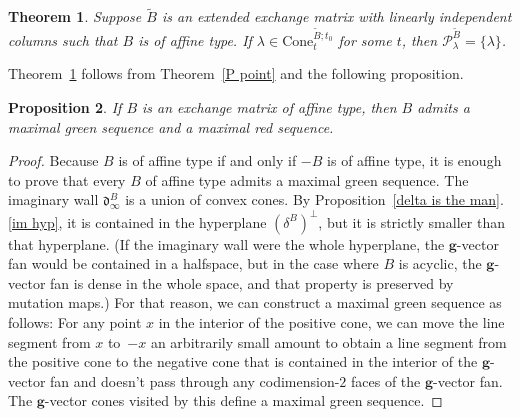 \documentclass{amsart}
\newtheorem{proposition}{Proposition}[section]
\newtheorem{theorem}[proposition]{Theorem}
\theoremstyle{definition}
\theoremstyle{remark}
\numberwithin{equation}{section}
\newcommand{\set}[1]{{\lbrace #1 \rbrace}}
\newcommand{\0}{{\mathbf{0}}}
\newcommand{\Cone}{\mathrm{Cone}}
\newcommand{\g}{\mathbf{g}}
\newcommand{\tB}{{\tilde{B}}}
\renewcommand{\P}{\mathcal{P}}
\renewcommand{\d}{{\mathfrak d}}
\begin{document}
\begin{theorem}\label{affine P point indep}
Suppose $\tB$ is an extended exchange matrix with linearly independent columns such that $B$ is of affine type.
If $\lambda\in\Cone^{\tB;t_0}_t$ for some $t$, then $\P^\tB_\lambda=\set{\lambda}$.
\end{theorem}

Theorem~\ref{affine P point indep} follows from Theorem~\ref{P point} and the following proposition.

\begin{proposition}\label{aff red}
If $B$ is an exchange matrix of affine type, then $B$ admits a maximal green sequence and a maximal red sequence.
\end{proposition}
\begin{proof}  
Because $B$ is of affine type if and only if $-B$ is of affine type, it is enough to prove that every $B$ of affine type admits a maximal green sequence.
The imaginary wall $\d^B_\infty$ is a union of convex cones.
By Proposition~\ref{delta is the man}.\ref{im hyp}, it is contained in the hyperplane $(\delta^B)^\perp$, but it is strictly smaller than that hyperplane.
(If the imaginary wall were the whole hyperplane, the $\g$-vector fan would be contained in a halfspace, but in the case where $B$ is acyclic, the $\g$-vector fan is dense in the whole space, and that property is preserved by mutation maps.) 
For that reason, we can construct a maximal green sequence as follows:
For any point $x$ in the interior of the positive cone, we can move the line segment from $x$ to~$-x$ an arbitrarily small amount to obtain a line segment from the positive cone to the negative cone that is contained in the interior of the $\g$-vector fan and doesn't pass through any codimension-$2$ faces of the $\g$-vector fan.
The $\g$-vector cones visited by this define a maximal green sequence.
\end{proof}
\end{document}
